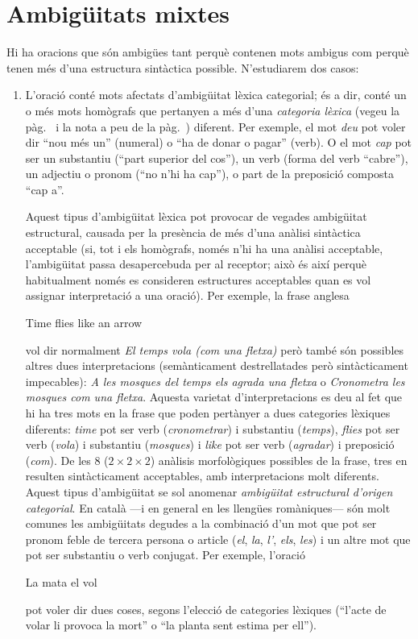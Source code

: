 \section{Ambigüitats mixtes}
Hi ha oracions que són ambigües tant perquè contenen mots ambigus com
perquè tenen més d'una estructura sintàctica possible. N'estudiarem
dos casos:
\begin{enumerate}
\item L'oració conté mots afectats d'ambigüitat lèxica categorial; és
  a dir, conté un o més mots homògrafs  que pertanyen a més d'una {\em
    categoria lèxica} (vegeu la pàg.~\pageref{pg:catlex} i la nota a
  peu de la pàg.~\pageref{pg:catgra}) diferent.  Per exemple, el mot {\em
    deu} pot voler dir ``nou més un'' (numeral) o ``ha de donar o
  pagar'' (verb).  O el mot \emph{cap} pot ser un substantiu (``part
  superior del cos''), un verb (forma del verb ``cabre''), un adjectiu
  o pronom (``no n'hi ha cap''), o part de la preposició composta
  ``cap a''.
  
  Aquest tipus d'ambigüitat lèxica pot provocar de vegades ambigüitat
  estructural, causada per la presència de més d'una anàlisi
  sintàctica acceptable (si, tot i els homògrafs, només n'hi ha una
  anàlisi acceptable, l'ambigüitat passa desapercebuda per al
  receptor; això és així perquè habitualment només es consideren
  estructures acceptables quan es vol assignar interpretació a una
  oració).  Per exemple, la frase anglesa
  \begin{exemple}
  Time flies like an arrow
  \end{exemple}
  vol dir normalment \emph{El temps vola (com una fletxa)} però també
  són possibles altres dues interpretacions (semànticament
  destrellatades però sintàcticament impecables): \emph{A les mosques
    del temps els agrada una fletxa} o \emph{Cronometra les mosques
    com una fletxa}.  Aquesta varietat d'interpretacions es deu al fet
  que hi ha tres mots en la frase que poden pertànyer a dues
  categories lèxiques diferents: \emph{time} pot ser verb (\emph{cronometrar}) i
  substantiu (\emph{temps}), \emph{flies} pot ser verb (\emph{vola}) i
  substantiu (\emph{mosques}) i \emph{like}
  pot ser verb (\emph{agradar}) i preposició (\emph{com}).  De les 8 ($2\times 2\times 2$) anàlisis
  morfològiques possibles de la frase, tres en resulten sintàcticament
  acceptables, amb interpretacions molt diferents. Aquest tipus
  d'ambigüitat se sol anomenar \emph{ambigüitat estructural d'origen
    categorial}. En català ---i en general en les llengües romàniques--- són molt comunes les
  ambigüitats degudes a la combinació d'un mot que pot ser pronom
  feble de tercera persona o article (\emph{el}, \emph{la}, \emph{l'},
  \emph{els}, \emph{les}) i un altre mot que pot ser substantiu o verb
  conjugat. Per exemple, l'oració
    \begin{exemple}
    La mata el vol
    \end{exemple} 
    pot voler dir dues coses, segons l'elecció de categories
    lèxiques (``l'acte de volar li provoca la mort'' o ``la planta
    sent estima per ell'').
  

\end{enumerate}
